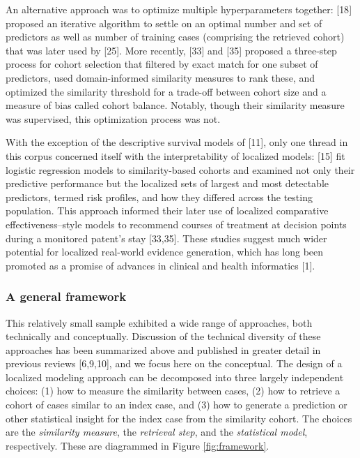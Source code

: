 \documentclass[preprint, 3p,
authoryear]{elsarticle} %
\begin{document}
An alternative approach was to optimize multiple hyperparameters
together: {[}18{]} proposed an iterative algorithm to settle on an
optimal number and set of predictors as well as number of training cases
(comprising the retrieved cohort) that was later used by {[}25{]}. More
recently, {[}33{]} and {[}35{]} proposed a three-step process for cohort
selection that filtered by exact match for one subset of predictors,
used domain-informed similarity measures to rank these, and optimized
the similarity threshold for a trade-off between cohort size and a
measure of bias called cohort balance. Notably, though their similarity
measure was supervised, this optimization process was not.

With the exception of the descriptive survival models of {[}11{]}, only
one thread in this corpus concerned itself with the interpretability of
localized models: {[}15{]} fit logistic regression models to
similarity-based cohorts and examined not only their predictive
performance but the localized sets of largest and most detectable
predictors, termed risk profiles, and how they differed across the
testing population. This approach informed their later use of localized
comparative effectiveness--style models to recommend courses of
treatment at decision points during a monitored patent's stay
{[}33,35{]}. These studies suggest much wider potential for localized
real-world evidence generation, which has long been promoted as a
promise of advances in clinical and health informatics {[}1{]}.

\hypertarget{a-general-framework}{%
\subsubsection{A general framework}\label{a-general-framework}}

This relatively small sample exhibited a wide range of approaches, both
technically and conceptually. Discussion of the technical diversity of
these approaches has been summarized above and published in greater
detail in previous reviews {[}6,9,10{]}, and we focus here on the
conceptual. The design of a localized modeling approach can be
decomposed into three largely independent choices: (1) how to measure
the similarity between cases, (2) how to retrieve a cohort of cases
similar to an index case, and (3) how to generate a prediction or other
statistical insight for the index case from the similarity cohort. The
choices are the \emph{similarity measure}, the \emph{retrieval step},
and the \emph{statistical model}, respectively. These are diagrammed in
Figure \ref{fig:framework}.
\end{document}
